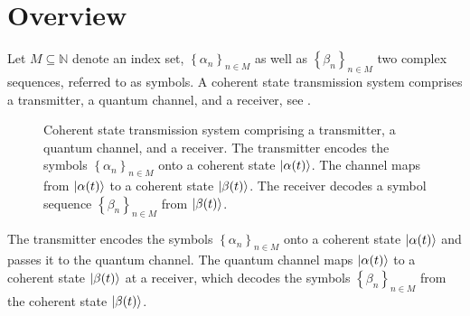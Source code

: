 \section{Overview}

Let $M\subseteq\mathbb{N}$ denote an index set, $\left\{\alpha_n\right\}_{n\in M}$ as well as $\left\{\beta_n\right\}_{n\in M}$ two complex sequences, referred to as symbols.
A coherent state transmission system comprises a transmitter, a quantum channel, and a receiver, see .
\begin{figure}[htb]
	\centering
	
	\caption{Coherent state transmission system comprising a transmitter, a quantum channel, and a receiver. The transmitter encodes the symbols $\left\{\alpha_n\right\}_{n\in M}$ onto a coherent state $\ket{\alpha(t)}$. The channel maps from $\ket{\alpha(t)}$ to a coherent state $\ket{\beta(t)}$. The receiver decodes a symbol sequence $\left\{\beta_n\right\}_{n\in M}$ from $\ket{\beta(t)}$.}\label{fig:transmission_system}
\end{figure}
The transmitter encodes the symbols $\left\{\alpha_n\right\}_{n\in M}$ onto a coherent state $\ket{\alpha(t)}$ and passes it to the quantum channel.
The quantum channel maps $\ket{\alpha(t)}$ to a coherent state $\ket{\beta(t)}$ at a receiver, which decodes the symbols $\left\{\beta_n\right\}_{n\in M}$ from the coherent state $\ket{\beta(t)}$.
